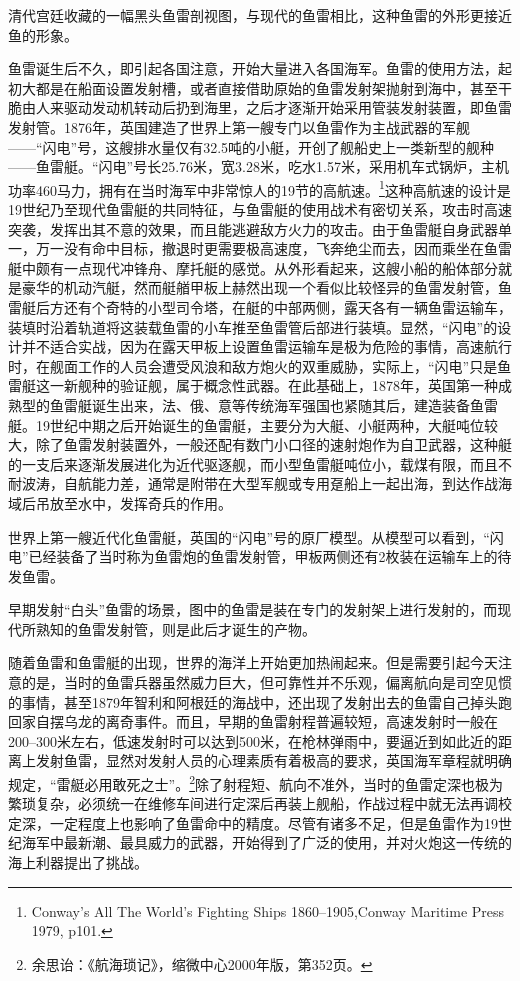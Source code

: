 \documentclass[12pt,UTF8]{ctexbook}
\begin{document}
清代宫廷收藏的一幅黑头鱼雷剖视图，与现代的鱼雷相比，这种鱼雷的外形更接近鱼的形象。

鱼雷诞生后不久，即引起各国注意，开始大量进入各国海军。鱼雷的使用方法，起初大都是在船面设置发射槽，或者直接借助原始的鱼雷发射架抛射到海中，甚至干脆由人来驱动发动机转动后扔到海里，之后才逐渐开始采用管装发射装置，即鱼雷发射管。1876年，英国建造了世界上第一艘专门以鱼雷作为主战武器的军舰——“闪电”号，这艘排水量仅有32.5吨的小艇，开创了舰船史上一类新型的舰种——鱼雷艇。“闪电”号长25.76米，宽3.28米，吃水1.57米，采用机车式锅炉，主机功率460马力，拥有在当时海军中非常惊人的19节的高航速。\footnote{Conway's All The World's Fighting Ships 1860--1905,Conway Maritime Press 1979, p101.}这种高航速的设计是19世纪乃至现代鱼雷艇的共同特征，与鱼雷艇的使用战术有密切关系，攻击时高速突袭，发挥出其不意的效果，而且能逃避敌方火力的攻击。由于鱼雷艇自身武器单一，万一没有命中目标，撤退时更需要极高速度，飞奔绝尘而去，因而乘坐在鱼雷艇中颇有一点现代冲锋舟、摩托艇的感觉。从外形看起来，这艘小船的船体部分就是豪华的机动汽艇，然而艇艏甲板上赫然出现一个看似比较怪异的鱼雷发射管，鱼雷艇后方还有个奇特的小型司令塔，在艇的中部两侧，露天各有一辆鱼雷运输车，装填时沿着轨道将这装载鱼雷的小车推至鱼雷管后部进行装填。显然，“闪电”的设计并不适合实战，因为在露天甲板上设置鱼雷运输车是极为危险的事情，高速航行时，在舰面工作的人员会遭受风浪和敌方炮火的双重威胁，实际上，“闪电”只是鱼雷艇这一新舰种的验证舰，属于概念性武器。在此基础上，1878年，英国第一种成熟型的鱼雷艇诞生出来，法、俄、意等传统海军强国也紧随其后，建造装备鱼雷艇。19世纪中期之后开始诞生的鱼雷艇，主要分为大艇、小艇两种，大艇吨位较大，除了鱼雷发射装置外，一般还配有数门小口径的速射炮作为自卫武器，这种艇的一支后来逐渐发展进化为近代驱逐舰，而小型鱼雷艇吨位小，载煤有限，而且不耐波涛，自航能力差，通常是附带在大型军舰或专用趸船上一起出海，到达作战海域后吊放至水中，发挥奇兵的作用。

世界上第一艘近代化鱼雷艇，英国的“闪电”号的原厂模型。从模型可以看到，“闪电”已经装备了当时称为鱼雷炮的鱼雷发射管，甲板两侧还有2枚装在运输车上的待发鱼雷。

早期发射“白头”鱼雷的场景，图中的鱼雷是装在专门的发射架上进行发射的，而现代所熟知的鱼雷发射管，则是此后才诞生的产物。

随着鱼雷和鱼雷艇的出现，世界的海洋上开始更加热闹起来。但是需要引起今天注意的是，当时的鱼雷兵器虽然威力巨大，但可靠性并不乐观，偏离航向是司空见惯的事情，甚至1879年智利和阿根廷的海战中，还出现了发射出去的鱼雷自己掉头跑回家自摆乌龙的离奇事件。而且，早期的鱼雷射程普遍较短，高速发射时一般在200--300米左右，低速发射时可以达到500米，在枪林弹雨中，要逼近到如此近的距离上发射鱼雷，显然对发射人员的心理素质有着极高的要求，英国海军章程就明确规定，“雷艇必用敢死之士”。\footnote{余思诒：《航海琐记》，缩微中心2000年版，第352页。}除了射程短、航向不准外，当时的鱼雷定深也极为繁琐复杂，必须统一在维修车间进行定深后再装上舰船，作战过程中就无法再调校定深，一定程度上也影响了鱼雷命中的精度。尽管有诸多不足，但是鱼雷作为19世纪海军中最新潮、最具威力的武器，开始得到了广泛的使用，并对火炮这一传统的海上利器提出了挑战。
\end{document}
